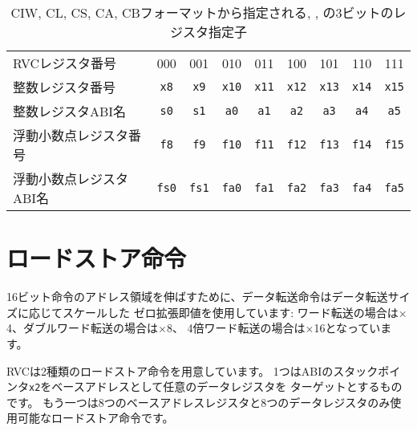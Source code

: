 \begin{table}[H]
{
\begin{center}
\begin{tabular}{l|c|c|c|c|c|c|c|c|}
\cline{2-9}
RVCレジスタ番号  & 000 & 001 & 010 & 011 & 100 & 101 & 110 & 111
\\ \cline{2-9}
整数レジスタ番号 & {\tt x8} & {\tt x9} & {\tt x10} & {\tt x11} & {\tt x12} & {\tt x13} & {\tt x14}  & {\tt x15} \\ \cline{2-9}
整数レジスタABI名    & {\tt s0}  &  {\tt s1} &  {\tt a0} &  {\tt a1} &  {\tt a2} &  {\tt a3} & {\tt a4}  & {\tt a5} \\ \cline{2-9}
浮動小数点レジスタ番号 & {\tt f8} & {\tt f9} & {\tt f10} & {\tt f11} & {\tt f12} & {\tt f13} & {\tt f14}  & {\tt f15} \\ \cline{2-9}
浮動小数点レジスタABI名    & {\tt fs0}  &  {\tt fs1} &  {\tt fa0} &  {\tt fa1} &  {\tt fa2} &  {\tt fa3} & {\tt fa4}  & {\tt fa5} \\ \cline{2-9}
\end{tabular}
\end{center}
}
\caption{CIW, CL, CS, CA, CBフォーマットから指定される{\em \rsoneprime}, {\em \rstwoprime}, {\em \rdprime} の3ビットのレジスタ指定子}
\label{registers}
\end{table}

\begin{comment}
\section{Load and Store Instructions}
\end{comment}
\section{ロードストア命令}

\begin{comment}
To increase the reach of 16-bit instructions, data-transfer
instructions use zero-extended immediates that are scaled by the size
of the data in bytes: $\times$4 for words, $\times$8 for double words,
and $\times$16 for quad words.
\end{comment}
16ビット命令のアドレス領域を伸ばすために、データ転送命令はデータ転送サイズに応じてスケールした
ゼロ拡張即値を使用しています: ワード転送の場合は$\times$4、ダブルワード転送の場合は$\times$8、
4倍ワード転送の場合は$\times$16となっています。

\begin{comment}
RVC provides two variants of loads and stores.  One uses the ABI stack
pointer, {\tt x2}, as the base address and can target any data register.  The
other can reference one of 8 base address registers and one of 8 data
registers.
\end{comment}
RVCは2種類のロードストア命令を用意しています。
1つはABIのスタックポインタ{\tt x2}をベースアドレスとして任意のデータレジスタを
ターゲットとするものです。
もう一つは8つのベースアドレスレジスタと8つのデータレジスタのみ使用可能なロードストア命令です。

